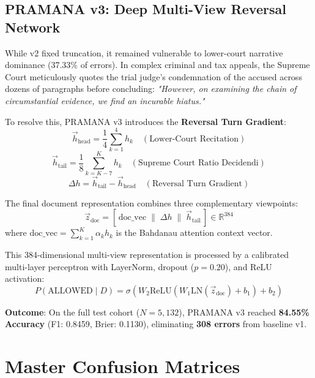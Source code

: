 \documentclass[journal,10pt,twocolumn]{IEEEtran}
\begin{document}
\subsection{PRAMANA v3: Deep Multi-View Reversal Network}
While v2 fixed truncation, it remained vulnerable to lower-court narrative dominance (37.33\% of errors). In complex criminal and tax appeals, the Supreme Court meticulously quotes the trial judge's condemnation of the accused across dozens of paragraphs before concluding: \textit{"However, on examining the chain of circumstantial evidence, we find an incurable hiatus."}

To resolve this, PRAMANA v3 introduces the \textbf{Reversal Turn Gradient}:
\begin{equation}
\vec{h}_{\text{head}} = \frac{1}{4} \sum_{k=1}^4 h_k \quad (\text{Lower-Court Recitation})
\end{equation}
\begin{equation}
\vec{h}_{\text{tail}} = \frac{1}{8} \sum_{k=K-7}^K h_k \quad (\text{Supreme Court Ratio Decidendi})
\end{equation}
\begin{equation}
\Delta h = \vec{h}_{\text{tail}} - \vec{h}_{\text{head}} \quad (\text{Reversal Turn Gradient})
\end{equation}

The final document representation combines three complementary viewpoints:
\begin{equation}
\vec{z}_{\text{doc}} = [\, \text{doc\_vec} \;\|\; \Delta h \;\|\; \vec{h}_{\text{tail}} \,] \in \mathbb{R}^{384}
\end{equation}
where $\text{doc\_vec} = \sum_{k=1}^K \alpha_k h_k$ is the Bahdanau attention context vector.

This 384-dimensional multi-view representation is processed by a calibrated multi-layer perceptron with LayerNorm, dropout ($p = 0.20$), and ReLU activation:
\begin{equation}
P(\text{ALLOWED} \mid D) = \sigma(W_2 \text{ReLU}(W_1 \text{LN}(\vec{z}_{\text{doc}}) + b_1) + b_2)
\end{equation}

\textbf{Outcome}: On the full test cohort ($N = 5,132$), PRAMANA v3 reached \textbf{84.55\% Accuracy} (F1: 0.8459, Brier: 0.1130), eliminating \textbf{308 errors} from baseline v1.

\section{Master Confusion Matrices}
\end{document}
